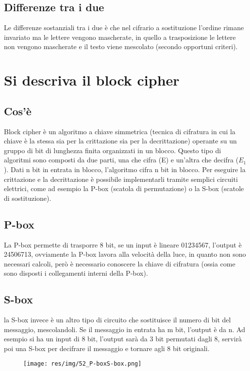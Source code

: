 \subsection{Differenze tra i due}
Le differenze sostanziali tra i due è che nel cifrario a sostituzione l'ordine rimane invariato ma le lettere vengono mascherate, in quello a trasposizione le lettere non vengono mascherate e il testo viene mescolato (secondo opportuni criteri).

\section{Si descriva il block cipher}
\subsection{Cos'è}
Block cipher è un algoritmo a chiave simmetrica (tecnica di cifratura in cui la chiave è la stessa sia per la crittazione sia per la decrittazione) operante su un gruppo di bit di lunghezza finita organizzati in un blocco.
Questo tipo di algoritmi sono composti da due parti, una che cifra (E) e un'altra che decifra ($E_1$).
Dati n bit in entrata in blocco, l'algoritmo cifra n bit in blocco.
Per eseguire la crittazione e la decrittazione è possibile implementarli tramite semplici circuiti elettrici, come ad esempio la P-box (scatola di permutazione) o la S-box (scatole di sostituzione).
\subsection{P-box}
La P-box permette di trasporre 8 bit, se un input è lineare 01234567, l'output è 24506713, ovviamente la P-box lavora alla velocità della luce, in quanto non sono necessari calcoli, però è necessario conoscere la chiave di cifratura (ossia come sono disposti i collegamenti interni della P-box).
\subsection{S-box}
la S-box invece è un altro tipo di circuito che sostituisce il numero di bit del messaggio, mescolandoli.
Se il messaggio in entrata ha m bit, l'output è da n. Ad esempio si ha un input di 8 bit, l'output sarà da 3 bit permutati dagli 8, servirà poi una S-box per decifrare il messaggio e tornare agli 8 bit originali. 


\begin{figure}[H]
\centering
\texttt{[image: res/img/52\_P-boxS-box.png]}
\end{figure}


